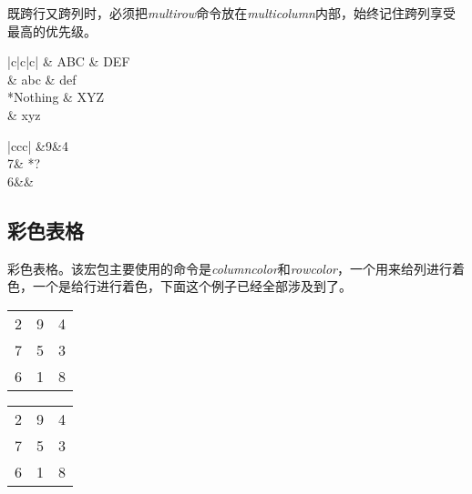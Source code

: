 既跨行又跨列时，必须把\emph{multirow}命令放在\emph{multicolumn}内部，始终记住跨列享受最高的优先级。

\begin{codeshow}
\centering
\begin{center}
    \begin{tabular}{|c|c|c|}
        \hline
        & ABC & DEF \\
         & abc & def \\
        \hline
        {*{Nothing}} & XYZ \\
         & xyz \\
        \hline
    \end{tabular}
\end{center}
\end{codeshow}

\begin{codeshow}
    \centering
    \begin{tabular}{|ccc|}
        &9&4\\
        7&
            {*{{?}}}\\
        6&&\\
        \hline
    \end{tabular}
\end{codeshow}

\subsection{彩色表格}

彩色表格。该宏包主要使用的命令是\emph{columncolor}和\emph{rowcolor}，一个用来给列进行着色，一个是给行进行着色，下面这个例子已经全部涉及到了。

\begin{codeshow}
    \centering
    \begin{tabular}{ccc}
        \rowcolor[gray]{.9}
        2&9&4\\
        \rowcolor[gray]{.8}
        7&5&3\\
        \rowcolor[gray]{.7}
        6&1&8\\
    \end{tabular}
\end{codeshow}

\begin{codeshow}
    \centering
    \begin{tabular}%
        {>{\columncolor[gray]{.9}}c%
        >{\columncolor[gray]{.8}}c%
        >{\columncolor[gray]{.7}}c}
        2&9&4\\
        7&5&3\\
        6&1&8\\
    \end{tabular}
\end{codeshow}

